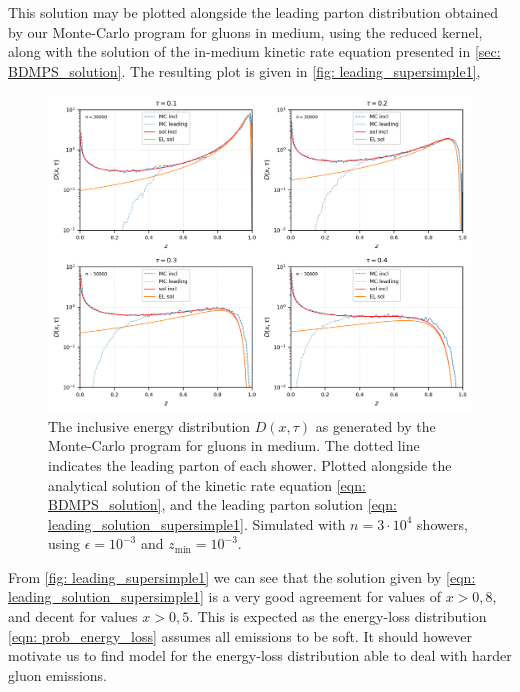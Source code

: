 \documentclass[main.tex]{subfiles}
\begin{document}
This solution may be plotted alongside the leading parton distribution obtained by our Monte-Carlo program for gluons in medium, using the reduced kernel, along with the solution of the in-medium kinetic rate equation presented in \autoref{sec: BDMPS_solution}. The resulting plot is given in \autoref{fig: leading_supersimple1},
\begin{figure}[htb]
    \centering
    \includegraphics[width=13cm]{pictures/plots/distributions/leading/leading_medium_30k_lin.png}
    \caption{The inclusive energy distribution \(D(x,\tau)\) as generated by the Monte-Carlo program for gluons in medium. The dotted line indicates the leading parton of each shower. Plotted alongside the analytical solution of the kinetic rate equation \autoref{eqn: BDMPS_solution}, and the leading parton solution \autoref{eqn: leading_solution_supersimple1}. Simulated with \(n = 3\cdot 10^4\) showers, using \(\epsilon=10^{-3}\) and \(z_{\text{min}}=10^{-3}\).}
    \label{fig: leading_supersimple1}
\end{figure}

From \autoref{fig: leading_supersimple1} we can see that the solution given by \autoref{eqn: leading_solution_supersimple1} is a very good agreement for values of \(x>0,8\), and decent for values \(x>0,5\). This is expected as the energy-loss distribution \autoref{eqn: prob_energy_loss} assumes all emissions to be soft. It should however motivate us to find model for the energy-loss distribution able to deal with harder gluon emissions.
\end{document}
